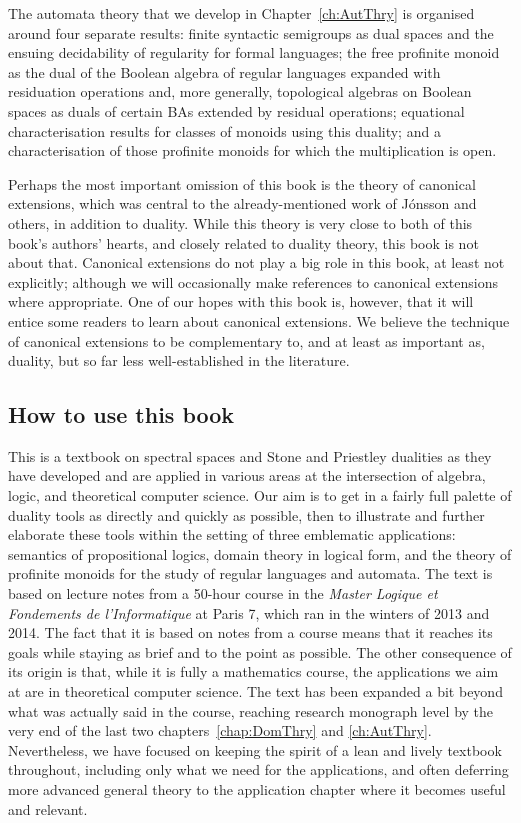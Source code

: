 The automata theory that we develop in Chapter~\ref{ch:AutThry} is organised around four separate results: finite syntactic semigroups as dual spaces and the ensuing decidability of regularity for formal languages; the free profinite monoid as the dual of the Boolean algebra of regular languages expanded with residuation operations and, more generally, topological algebras on Boolean spaces as duals of certain BAs extended by residual operations; equational characterisation results for classes of monoids using this duality; and a characterisation of those profinite monoids for which the multiplication is open.

Perhaps the most important omission of this book is the theory of canonical extensions, which was central to the already-mentioned work of J\'onsson and others, in addition to duality. While this theory is very close to both of this book's authors' hearts, and closely related to duality theory, this book is not about that. Canonical extensions do not play a big role in this book, at least not explicitly; although we will occasionally make references to canonical extensions where appropriate.
One of our hopes with this book is, however, that it will entice some readers to learn about canonical extensions. We believe the technique of canonical extensions to be complementary to, and at least as important as, duality, but so far less well-established in the literature.


\subsection*{How to use this book}
This is a textbook on spectral spaces and Stone and Priestley dualities as they have developed and are applied in various areas at the intersection of algebra, logic, and theoretical computer science. Our aim is to get in a fairly full palette of duality tools as directly and quickly as possible, then to illustrate and further elaborate these tools within the setting of three emblematic applications: semantics of propositional logics, domain theory in logical form, and the theory of profinite monoids for the study of regular languages and automata. 
The text is based on lecture notes from a 50-hour course in the \emph{Master Logique et Fondements de l'Informatique} at Paris 7, which ran in the winters of 2013 and 2014. The fact that it is based on notes from a course means that it reaches its goals while staying as brief and to the point as possible. The other consequence of its origin is that, while it is fully a mathematics course, the applications we aim at are in theoretical computer science. The text has been expanded a bit beyond what was actually said in the course, reaching research monograph level by the very end of the last two chapters~\ref{chap:DomThry} and \ref{ch:AutThry}. Nevertheless, we have focused on keeping the spirit of a lean and lively textbook throughout, including only what we need for the applications, and often deferring more advanced general theory to the application chapter where it becomes useful and relevant.

